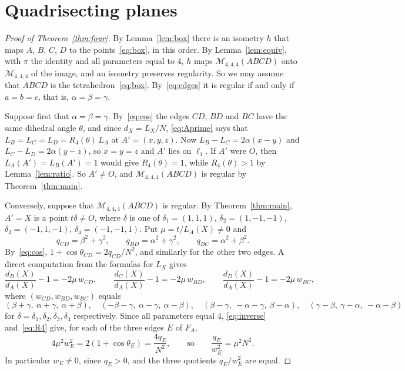 \documentclass[11pt]{amsart}
\theoremstyle{definition}
\theoremstyle{remark}
\numberwithin{equation}{section}
\newcommand{\M}{\mathcal{M}}
\begin{document}
\section{Quadrisecting planes}\label{sec:four}

\begin{proof}[Proof of Theorem~\ref{thm:four}]
By Lemma~\ref{lem:box} there is an isometry $h$ that maps $A$, $B$, $C$, $D$ to the points~\eqref{eq:box}, in this order. By Lemma~\ref{lem:equiv}, with $\pi$ the identity and all parameters equal to $4$, $h$ maps $\M_{4,4,4}(ABCD)$ onto $\M_{4,4,4}$ of the image, and an isometry preserves regularity. So we may assume that $ABCD$ is the tetrahedron~\eqref{eq:box}. By~\eqref{eq:edges} it is regular if and only if $a=b=c$, that is, $\alpha=\beta=\gamma$.

Suppose first that $\alpha=\beta=\gamma$. By~\eqref{eq:cos} the edges $CD$, $BD$ and $BC$ have the same dihedral angle $\theta$, and since $d_X=L_X/N$, \eqref{eq:Aprime} says that $L_B=L_C=L_D=R_4(\theta)\,L_A$ at $A'=(x,y,z)$. Now $L_B-L_C=2\alpha(x-y)$ and $L_C-L_D=2\alpha(y-z)$, so $x=y=z$ and $A'$ lies on $\ell_1$. If $A'$ were $O$, then $L_A(A')=L_B(A')=1$ would give $R_4(\theta)=1$, while $R_4(\theta)>1$ by Lemma~\ref{lem:ratio}. So $A'\ne O$, and $\M_{4,4,4}(ABCD)$ is regular by Theorem~\ref{thm:main}.

Conversely, suppose that $\M_{4,4,4}(ABCD)$ is regular. By Theorem~\ref{thm:main}, $A'=X$ is a point $t\delta\neq O$, where $\delta$ is one of $\delta_1=(1,1,1)$, $\delta_2=(1,-1,-1)$, $\delta_3=(-1,1,-1)$, $\delta_4=(-1,-1,1)$. Put $\mu=t/L_A(X)\ne0$ and
\[
q_{CD}=\beta^2+\gamma^2,\qquad q_{BD}=\alpha^2+\gamma^2,\qquad q_{BC}=\alpha^2+\beta^2 .
\]
By~\eqref{eq:cos}, $1+\cos\theta_{CD}=2q_{CD}/N^2$, and similarly for the other two edges. A direct computation from the formulas for $L_X$ gives
\[
\frac{d_B(X)}{d_A(X)}-1=-2\mu\,w_{CD},\qquad \frac{d_C(X)}{d_A(X)}-1=-2\mu\,w_{BD},\qquad \frac{d_D(X)}{d_A(X)}-1=-2\mu\,w_{BC},
\]
where $(w_{CD},w_{BD},w_{BC})$ equals
\[
(\beta+\gamma,\ \alpha+\gamma,\ \alpha+\beta),\quad
(-\beta-\gamma,\ \alpha-\gamma,\ \alpha-\beta),\quad
(\beta-\gamma,\ -\alpha-\gamma,\ \beta-\alpha),\quad
(\gamma-\beta,\ \gamma-\alpha,\ -\alpha-\beta)
\]
for $\delta=\delta_1,\delta_2,\delta_3,\delta_4$ respectively. Since all parameters equal $4$, \eqref{eq:inverse} and~\eqref{eq:R4} give, for each of the three edges $E$ of $F_A$,
\[
4\mu^2w_E^2=2(1+\cos\theta_E)=\frac{4q_E}{N^2},\qquad\text{so}\qquad \frac{q_E}{w_E^2}=\mu^2N^2.
\]
In particular $w_E\ne0$, since $q_E>0$, and the three quotients $q_E/w_E^2$ are equal.


\end{proof}
\end{document}
